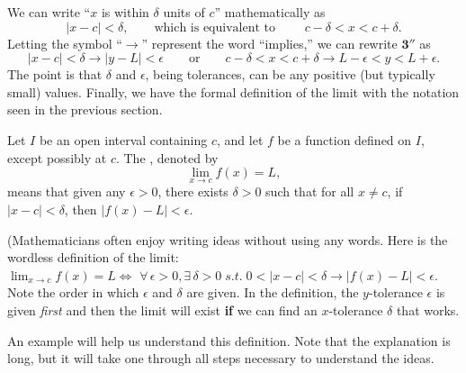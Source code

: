 We can write ``$x$ is within $\delta$ units of $c$'' mathematically as
$$|x-c| < \delta, \qquad \text{which is equivalent to }\qquad c-\delta < x < c+\delta.$$
Letting the symbol ``$\longrightarrow$'' represent the word ``implies,'' we can rewrite $\textbf{3}''$ as 
$$
|x - c| < \delta \longrightarrow  |y - L| < \epsilon 
\qquad \textrm{or} \qquad c - \delta < x < c + \delta \longrightarrow L - \epsilon < y < L + \epsilon.
$$
The point is that $\delta$ and $\epsilon$, being tolerances, can be any positive (but typically small) values.  Finally, we have the formal definition of the limit with the notation  seen in the previous section.

{Let $I$ be an open interval containing $c$, and let $f$ be a function defined on $I$, except possibly at $c$. The , denoted by  
$$\displaystyle \lim_{x\rightarrow c} f(x) = L,$$
means that given any $\epsilon > 0$, there exists $\delta > 0$ such that for all $x\neq c$,  
if  $|x - c| < \delta$, then $|f(x) - L| < \epsilon$.
}

(Mathematicians often enjoy writing ideas without using any words. Here is the wordless definition of the limit:\\

$\displaystyle \lim_{x\rightarrow c} f(x) = L \iff$
$\forall \, \epsilon > 0, \exists \, \delta > 0 \; s.t. \;
0<|x - c| < \delta \longrightarrow |f(x) - L| < \epsilon$.\text{)}\\

Note the order in which $\epsilon$ and $\delta$ are given.  In the definition, the $y$-tolerance $\epsilon$ is given \textit{first} and then the limit will exist {\bf if} we can find an $x$-tolerance $\delta$ that works.  

An example will help us understand this definition.  Note that the explanation is long, but it will take one through all steps necessary to understand the ideas.\\

